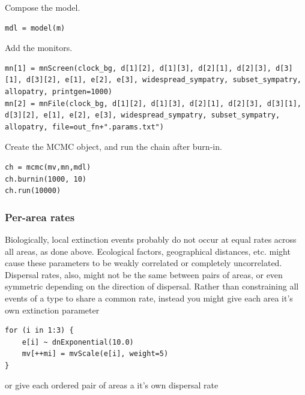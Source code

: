 Compose the model.

\begin{snugshade}
\begin{lstlisting}
mdl = model(m)
\end{lstlisting}
\end{snugshade}

Add the monitors.

\begin{snugshade}
\begin{lstlisting}
mn[1] = mnScreen(clock_bg, d[1][2], d[1][3], d[2][1], d[2][3], d[3][1], d[3][2], e[1], e[2], e[3], widespread_sympatry, subset_sympatry, allopatry, printgen=1000)
mn[2] = mnFile(clock_bg, d[1][2], d[1][3], d[2][1], d[2][3], d[3][1], d[3][2], e[1], e[2], e[3], widespread_sympatry, subset_sympatry, allopatry, file=out_fn+".params.txt")
\end{lstlisting}
\end{snugshade}

Create the MCMC object, and run the chain after burn-in.
\begin{snugshade}
\begin{lstlisting}
ch = mcmc(mv,mn,mdl)
ch.burnin(1000, 10)
ch.run(10000)
\end{lstlisting}
\end{snugshade}

\subsubsection{Per-area rates}

Biologically, local extinction events probably do not occur at equal rates across all areas, as done above.
Ecological factors, geographical distances, etc. might cause these parameters to be weakly correlated or completely uncorrelated.
Dispersal rates, also, might not be the same between pairs of areas, or even symmetric depending on the direction of dispersal.
Rather than constraining all events of a type to share a common rate, instead you might give each area it's own extinction parameter

\begin{snugshade}
\begin{lstlisting}
for (i in 1:3) {
    e[i] ~ dnExponential(10.0)
    mv[++mi] = mvScale(e[i], weight=5)
}
\end{lstlisting}
\end{snugshade}

or give each ordered pair of areas a it's own dispersal rate

